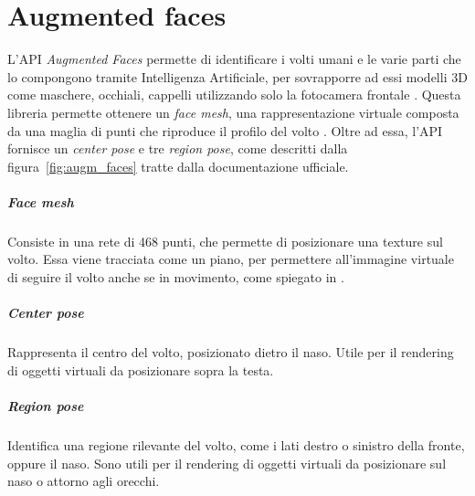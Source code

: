 \documentclass[crop=false, class=book]{standalone}
\begin{document}
	\chapter{Augmented faces}
	L'API \textit{Augmented Faces} permette di identificare i volti umani e le varie parti che lo compongono tramite Intelligenza Artificiale, per sovrapporre ad essi modelli 3D come maschere, occhiali, cappelli utilizzando solo la fotocamera frontale \cite{google2022faces}. 
	Questa libreria permette ottenere un \textit{face mesh}, una rappresentazione virtuale composta da una maglia di punti che riproduce il profilo del volto \cite{oufqir2020arkit}. Oltre ad essa, l'API fornisce un \textit{center pose} e tre \textit{region pose}, come descritti dalla figura~\vref{fig:augm_faces} tratte dalla documentazione ufficiale.
	\paragraph*{Face mesh}
		Consiste in una rete di 468 punti, che permette di posizionare una texture sul volto. Essa viene tracciata come un piano, per permettere all'immagine virtuale di seguire il volto anche se in movimento, come spiegato in \cite{googleblog2019faces}.
	\paragraph*{Center pose}
		Rappresenta il centro del volto, posizionato dietro il naso. Utile per il rendering di oggetti virtuali da posizionare sopra la testa.
	\paragraph*{Region pose}
		Identifica una regione rilevante del volto, come i lati destro o sinistro della fronte, oppure il naso. Sono utili per il rendering di oggetti virtuali da posizionare sul naso o attorno agli orecchi.
	
\end{document}
